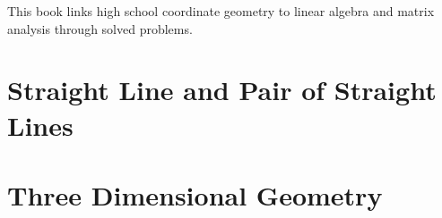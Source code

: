 \documentclass[11pt]{book}
\begin{document}

\setcounter{page}{1}

\begin{introduction}
This book links high school coordinate geometry to linear algebra and matrix analysis through solved problems.

\end{introduction}

\mainmatter

\chapter{Straight Line and Pair of Straight Lines}

\chapter{Three Dimensional Geometry}

\end{document}
